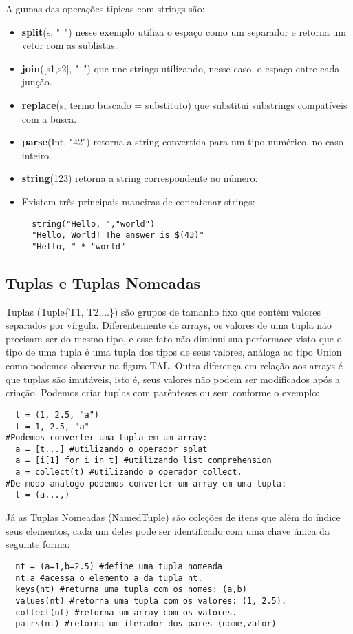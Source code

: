 Algumas das operações típicas com strings são:
\begin{itemize}
    \item \textbf{split}(s, "\ ") nesse exemplo utiliza o espaço como um separador e retorna um vetor com as sublistas.
    \item \textbf{join}([s1,s2], "\ ") que une strings utilizando, nesse caso, o espaço entre cada junção.
    \item \textbf{replace}(s, {termo buscado} =  {substituto}) que substitui substrings compatíveis com a busca.
    \item \textbf{parse}(Int, "42") retorna a string convertida para um tipo numérico, no caso inteiro.
    \item \textbf{string}(123) retorna a string correspondente ao número.
    \item Existem três principais maneiras de concatenar strings:
        \subitem 
        \begin{lstlisting}    
  string("Hello, ","world")
  "Hello, World! The answer is $(43)"
  "Hello, " * "world"
        \end{lstlisting}
        
\end{itemize}


\subsection{Tuplas e Tuplas Nomeadas}
Tuplas (Tuple\{T1, T2,...\}) são grupos de tamanho fixo que contém valores separados por vírgula. Diferentemente de arrays, os valores de uma tupla não precisam ser do mesmo tipo, e esse fato não diminui sua performace visto que o tipo de uma tupla é uma tupla dos tipos de seus valores, análoga ao tipo Union{} como podemos observar na figura TAL. 
 Outra diferença em relação aos arrays é que tuplas são imutáveis, isto é, seus valores não podem ser modificados após a criação.   
 Podemos criar tuplas com parênteses ou sem conforme o exemplo:
\begin{lstlisting}
  t = (1, 2.5, "a")
  t = 1, 2.5, "a"
#Podemos converter uma tupla em um array:
  a = [t...] #utilizando o operador splat
  a = [i[1] for i in t] #utilizando list comprehension
  a = collect(t) #utilizando o operador collect. 
#De modo analogo podemos converter um array em uma tupla:
  t = (a...,)
\end{lstlisting}  
Já as Tuplas Nomeadas (NamedTuple) são coleções de itens que além do índice seus elementos, cada um deles pode ser identificado com uma chave única da seguinte forma: 
\begin{lstlisting}
  nt = (a=1,b=2.5) #define uma tupla nomeada
  nt.a #acessa o elemento a da tupla nt.
  keys(nt) #returna uma tupla com os nomes: (a,b)
  values(nt) #retorna uma tupla com os valores: (1, 2.5).
  collect(nt) #retorna um array com os valores.
  pairs(nt) #retorna um iterador dos pares (nome,valor) 
\end{lstlisting}

